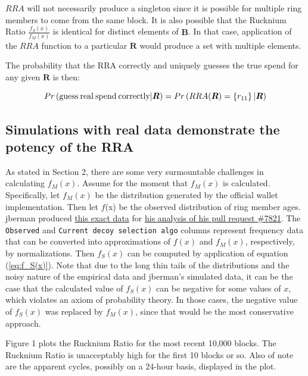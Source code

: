 \documentclass[english]{paper}
\begin{document}
$RRA$ will not necessarily produce a singleton since it is possible
for multiple ring members to come from the same block. It is also
possible that the Rucknium Ratio $\frac{f_{S}(x)}{f_{M}(x)}$ is identical
for distinct elements of $\boldsymbol{B}$. In that case, application
of the $RRA$ function to a particular $\boldsymbol{R}$ would produce
a set with multiple elements.

The probability that the RRA correctly and uniquely guesses the true
spend for any given $\boldsymbol{R}$ is then:

\begin{equation}
Pr\left(\text{{guess\:real\:spend\:correctly}}|\boldsymbol{R}\right)=Pr\left(RRA(\boldsymbol{R})=\left\{ r_{11}\right\} |\boldsymbol{R}\right)\label{eq:guess_real_spend}
\end{equation}


\subsection{Simulations with real data demonstrate the potency of the RRA}

As stated in Section 2, there are some very surmountable challenges
in calculating $f_{M}(x)$. Assume for the moment that $f_{M}(x)$
is calculated. Specifically, let $f_{M}(x)$ be the distribution generated
by the official wallet implementation. Then let $f$(x) be the observed
distribution of ring member ages. jberman produced \href{https://github.com/monero-project/monero/files/6968268/output_age_data.zip}{this exact data}
for \href{https://github.com/monero-project/monero/pull/7821}{his analysis of his pull request \#7821}.
The \texttt{Observed} and \texttt{Current decoy selection algo} columns
represent frequency data that can be converted into approximations
of $f(x)$ and $f_{M}(x)$, respectively, by normalizations. Then
$f_{S}(x)$ can be computed by application of equation (\ref{eq:f_S(x)}).
Note that due to the long thin tails of the distributions and the
noisy nature of the empirical data and jberman's simulated data, it
can be the case that the calculated value of $f_{S}(x)$ can be negative
for some values of $x$, which violates an axiom of probability theory.
In those cases, the negative value of $f_{S}(x)$ was replaced by
$f_{M}(x)$, since that would be the most conservative approach.

Figure 1 plots the Rucknium Ratio for the most recent 10,000 blocks.
The Rucknium Ratio is unacceptably high for the first 10 blocks or
so. Also of note are the apparent cycles, possibly on a 24-hour basis,
displayed in the plot.
\end{document}
